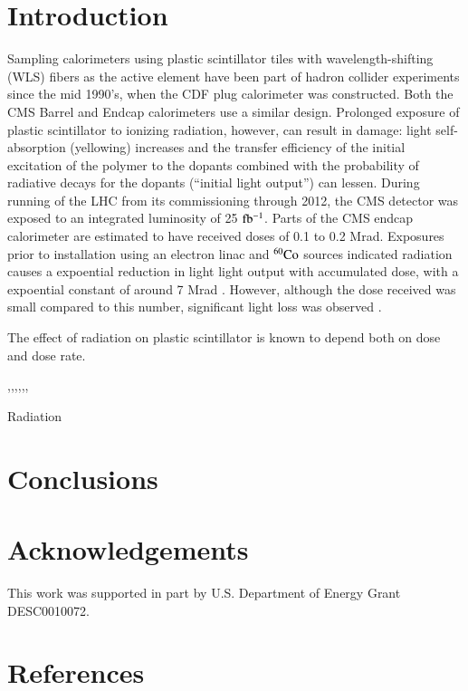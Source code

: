\documentclass[review]{elsarticle}
\begin{document}
\section{Introduction}
Sampling calorimeters using plastic scintillator tiles
with wavelength-shifting (WLS) fibers as the active element
have been part of hadron
collider experiments since the mid 1990's, when the CDF plug
calorimeter was constructed\cite{Aota1995557}.  Both the CMS
Barrel\cite{CMSHB} and Endcap\cite{HCALTDR1997} calorimeters use a similar design.
Prolonged exposure of plastic scintillator to
ionizing radiation, however, can result in damage:
light self-absorption (yellowing) increases and
the transfer efficiency of the initial excitation of the polymer to the
dopants combined with the probability of radiative decays for the dopants (``initial light output'') can lessen.  
During running of the LHC from its commissioning through 2012, the CMS
detector was exposed to an integrated luminosity of 25 ${\rm fb^{-1}}$.  Parts of the
CMS endcap calorimeter are estimated to have received doses of 0.1 to 0.2 Mrad\cite{ecfa2015}.
Exposures prior to installation
using an electron linac and ${\rm ^{60}Co}$ sources
indicated radiation causes a expoential reduction in light
light output with accumulated dose, with a expoential constant of 
around 7 Mrad \cite{vasken}.  However, although the dose received was
small compared to this number,
significant light loss was observed \cite{phaseiitdr}.


The effect of radiation on plastic scintillator is known to depend
both on dose and dose rate.

\cite{sauli},\cite{34504},\cite{Wick1991472},\cite{289295},\cite{173180},\cite{173178},\cite{Giokaris1993315}

Radiation

\section{Conclusions}

\section{Acknowledgements}

This work was supported in part by U.S. Department of Energy Grant DESC0010072.

\section*{References}


\end{document}
